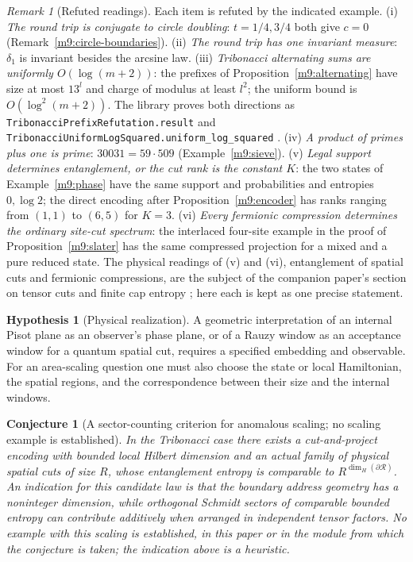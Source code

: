 \documentclass[11pt,reqno]{amsart}
\newtheorem{conjecture}[theorem]{Conjecture}
\theoremstyle{definition}
\newtheorem{hypothesis}[theorem]{Hypothesis}
\theoremstyle{remark}
\newtheorem{remark}[theorem]{Remark}
\numberwithin{equation}{section}
\begin{document}
\begin{remark}[Refuted readings]\label{m9:refuted}\sloppy
Each item is refuted by the indicated example.
(i) \emph{The round trip is conjugate to circle doubling}: \(t=1/4,3/4\)
both give \(c=0\) (Remark~\ref{m9:circle-boundaries}).
(ii) \emph{The round trip has one invariant measure}: \(\delta_1\) is
invariant besides the arcsine law.
(iii) \emph{Tribonacci alternating sums are uniformly \(O(\log(m+2))\)}:
the prefixes of Proposition~\ref{m9:alternating} have size at most
\(13^l\) and charge of modulus at least \(l^2\); the uniform bound is
\(O(\log^2(m+2))\). The library proves both directions as
\texttt{TribonacciPrefixRefutation}\allowbreak\texttt{.result} and
\texttt{TribonacciUniformLogSquared}\allowbreak\texttt{.uniform\_log\_squared} \cite{Tru}.
(iv) \emph{A product of primes plus one is prime}: \(30031=59\cdot509\)
(Example~\ref{m9:sieve}).
(v) \emph{Legal support determines entanglement, or the cut rank is the
constant \(K\)}: the two states of Example~\ref{m9:phase} have the same
support and probabilities and entropies \(0,\log2\); the direct encoding
after Proposition~\ref{m9:encoder} has ranks ranging from \((1,1)\) to
\((6,5)\) for \(K=3\).
(vi) \emph{Every fermionic compression determines the ordinary site-cut
spectrum}: the interlaced four-site example in the proof of
Proposition~\ref{m9:slater} has the same compressed projection for a mixed
and a pure reduced state.
The physical readings of (v) and (vi), entanglement of spatial cuts and
fermionic compressions, are the subject of the companion paper's section on
tensor cuts and finite cap entropy \cite{Companion}; here each is kept as
one precise statement.
\end{remark}

\begin{hypothesis}[Physical realization]\label{m9:physical}
A geometric interpretation of an internal Pisot plane as an
observer's phase plane, or of a Rauzy window as an acceptance
window for a quantum spatial cut, requires a specified embedding
and observable. For an area-scaling question one must also
choose the state or local Hamiltonian, the spatial regions, and
the correspondence between their size and the internal windows.
\end{hypothesis}

\begin{conjecture}[A sector-counting criterion for anomalous scaling; no scaling example is established]\label{m9:fract-conjecture}
In the Tribonacci case there exists a cut-and-project encoding
with bounded local Hilbert dimension and an actual family of
physical spatial cuts of size \(R\), whose entanglement entropy
is comparable to \(R^{\dim_H(\partial\mathcal R)}\).
An indication for this candidate law is that the boundary
address geometry has a noninteger dimension, while orthogonal
Schmidt sectors of comparable bounded entropy can contribute
additively when arranged in independent tensor factors.
No example with this scaling is established, in this paper or in the
module from which the conjecture is taken; the indication above is a
heuristic.
\end{conjecture}
\end{document}
